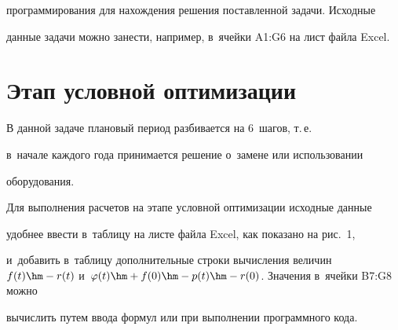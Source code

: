 программирования для на\-хож\-де\-ния решения по\-став\-лен\-ной задачи. Исходные 


данные задачи можно занести, например, в~ячейки A1:G6 на лист файла Excel.


  


\section{Этап условной оптимизации}





  В данной задаче плановый период разбивается на 6~шагов, т.\,е.\ 


в~начале каж\-до\-го года принимается решение о~замене или использовании 


оборудования.


  


  Для выполнения расчетов на этапе услов\-ной оптимизации исходные данные 


удобнее ввести в~таб\-ли\-цу на листе файла Excel, как показано на рис.~1, 


и~добавить в~таб\-ли\-цу дополнительные строки вы\-чис\-ле\-ния величин $f(t) \hm- 


r(t)$ и~$\varphi (t)\hm + f(0) \hm- p(t) \hm- r(0)$. Значения в~ячейки B7:G8 мож\-но 


вы\-чис\-лить путем ввода формул или при выполнении программного кода.


  


